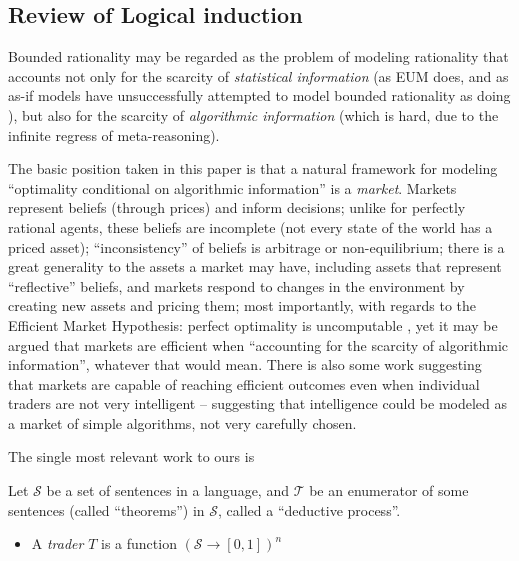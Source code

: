 \subsection{Review of Logical induction}





Bounded rationality may be regarded as the problem of modeling rationality that accounts not only for the scarcity of \emph{statistical information} (as EUM does, and as as-if models have unsuccessfully attempted to model bounded rationality as doing \cite{rationalization_discounting, rationalization_inattention, rationalization_inattention_2}), but also for the scarcity of \emph{algorithmic information} (which is hard, due to the infinite regress of meta-reasoning).

The basic position taken in this paper is that a natural framework for modeling ``optimality conditional on algorithmic information'' is a \emph{market}. Markets represent beliefs (through prices) and inform decisions; unlike for perfectly rational agents, these beliefs are incomplete (not every state of the world has a priced asset); ``inconsistency'' of beliefs is arbitrage or non-equilibrium; there is a great generality to the assets a market may have, including assets that represent ``reflective'' beliefs, and markets respond to changes in the environment by creating new assets and pricing them; most importantly, with regards to the Efficient Market Hypothesis: perfect optimality is uncomputable \cite{chaitin_marketequilibrium, emh_nogo_1, emh_nogo_2, emh_nogo_3, emh_nogo_4, emh_nogo_5, emh_nogo_6, emh_nogo_7, emh_nogo_8, emh_nogo_9, emh_nogo_10, emh_nogo_11, emh_nogo_12, emh_nogo_13}, yet it may be argued that markets are efficient when ``accounting for the scarcity of algorithmic information'', whatever that would mean. There is also some work suggesting that markets are capable of reaching efficient outcomes even when individual traders are not very intelligent \cite{gs_1, gs_2, gs_3, gs_laibson, gs_schwarz} -- suggesting that intelligence could be modeled as a market of simple algorithms, not very carefully chosen. 

The single most relevant work to ours is \cite{logical_induction} 

\begin{definition}\label{def:li}
    Let $\mathcal{S}$ be a set of sentences in a language, and $\mathcal{T}$ be an enumerator of some sentences (called ``theorems'') in $\mathcal{S}$, called a ``deductive process''. 
    \begin{itemize}
        \item A \emph{trader} $T$ is a function $(\mathcal{S}\to[0,1])^n$
    \end{itemize}

\end{definition}